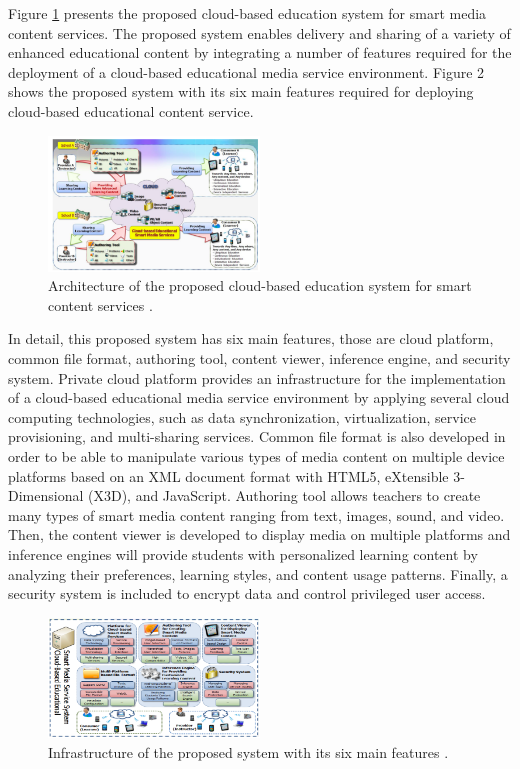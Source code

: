 \documentclass[journal]{vgtc}
\begin{document}
  Figure \ref{archi} presents the proposed cloud-based education system for smart media content services. The proposed system enables delivery and sharing of a variety of enhanced educational content by integrating a number of features required for the deployment of a cloud-based educational media service environment. Figure 2 shows the proposed system with its six main features required for deploying cloud-based educational content service.

  \begin{figure}[t]
    \centering
    \includegraphics[width=0.5\textwidth]{content-oriented-archi}
    \caption{Architecture of the proposed cloud-based education system for smart content services \cite{jeong2013content}.}
    \label{archi}
  \end{figure}

  In detail, this proposed system has six main features, those are cloud platform, common file format, authoring tool, content viewer, inference engine, and security system. Private cloud platform provides an infrastructure for the implementation of a cloud-based educational media service environment by applying several cloud computing technologies, such as data synchronization, virtualization, service provisioning, and multi-sharing services. Common file format is also developed in order to be able to manipulate various types of media content on multiple device platforms based on an XML document format with HTML5, eXtensible 3-Dimensional (X3D), and JavaScript. Authoring tool allows teachers to create many types of smart media content ranging from text, images, sound, and video. Then, the content viewer is developed to display media on multiple platforms and inference engines will provide students with personalized learning content by analyzing their preferences, learning styles, and content usage patterns. Finally, a security system is included to encrypt data and control privileged user access.

  \begin{figure}[!b]
    \centering
    \includegraphics[width=0.5\textwidth]{content-oriented-feature}
    \caption{Infrastructure of the proposed system with its six main features \cite{jeong2013content}.}
    \label{feature}
  \end{figure}
\end{document}
